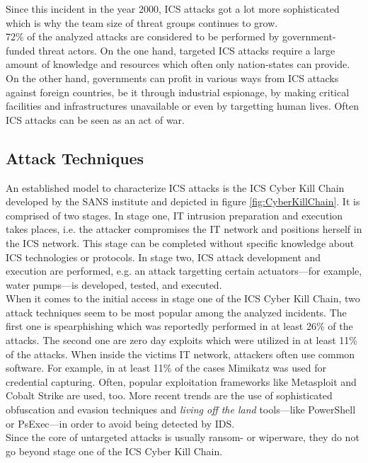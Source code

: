\documentclass[runningheads]{llncs}
\begin{document}
Since this incident in the year 2000, ICS attacks got a lot more sophisticated which is why the team size of threat groups continues to grow.\\
72\% of the analyzed attacks are considered to be performed by government-funded threat actors.
On the one hand, targeted ICS attacks require a large amount of knowledge and resources which often only nation-states can provide.
On the other hand, governments can profit in various ways from ICS attacks against foreign countries, be it through industrial espionage, by making critical facilities and infrastructures unavailable or even by targetting human lives.
Often ICS attacks can be seen as an act of war. %

\subsection{Attack Techniques}
An established model to characterize ICS attacks is the ICS Cyber Kill Chain developed by the SANS institute and depicted in figure \ref{fig:CyberKillChain}.
It is comprised of two stages.
In stage one, IT intrusion preparation and execution takes places, i.e. the attacker compromises the IT network and positions herself in the ICS network.
This stage can be completed without specific knowledge about ICS technologies or protocols.
In stage two, ICS attack development and execution are performed, e.g. an attack targetting certain actuators---for example, water pumps---is developed, tested, and executed.\\
When it comes to the initial access in stage one of the ICS Cyber Kill Chain, two attack techniques seem to be most popular among the analyzed incidents.
The first one is spearphishing which was reportedly performed in at least 26\% of the attacks.
The second one are zero day exploits which were utilized in at least 11\% of the attacks.
When inside the victims IT network, attackers often use common software.
For example, in at least 11\% of the cases Mimikatz was used for credential capturing.
Often, popular exploitation frameworks like Metasploit and Cobalt Strike are used, too.
More recent trends are the use of sophisticated obfuscation and evasion techniques and \textit{living off the land} tools---like PowerShell or PsExec---in order to avoid being detected by IDS.\\
Since the core of untargeted attacks is usually ransom- or wiperware, they do not go beyond stage one of the ICS Cyber Kill Chain.
\end{document}
